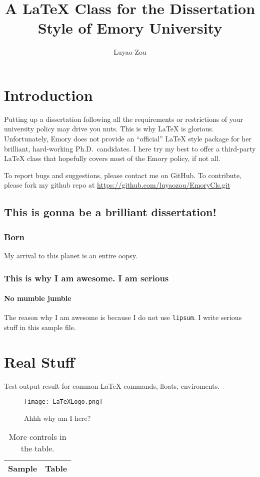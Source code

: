 \documentclass[draft,12pt]{emory}
\title{A \LaTeX{} Class for the Dissertation Style of Emory University}
\author{Luyao Zou}                      %
\begin{document}
\chapter{Introduction}
Putting up a dissertation following all the requirements or restrictions of
your university policy may drive you nuts. This is why \LaTeX{} is glorious. 
Unfortunately, Emory does not provide an ``official'' \LaTeX{} style package for
her brilliant, hard-working Ph.D.\ candidates. I here try my best to offer a
third-party \LaTeX{} class that hopefully covers most of the Emory policy, if not
all.

To report bugs and suggestions, please contact me on GitHub. To contribute, 
please fork my github repo at \url{https://github.com/luyaozou/EmoryCls.git}
  
\section{This is gonna be a brilliant dissertation!}
\subsection{Born}
My arrival to this planet is an entire oopsy. 


\subsection{This is why I am awesome. I am serious}
\subsubsection{No mumble jumble}
The reason why I am awesome is because I do not use \verb|lipsum|. I write 
serious stuff in this sample file.

\chapter{Real Stuff}
Test output result for common \LaTeX{} commands, floats, enviroments.

\begin{figure}[htp!]
  \centering
  \texttt{[image: LaTeXLogo.png]}
  \caption{Ahhh why am I here?}
\end{figure}

\begin{table}[htp!]
  \centering
  \caption{More controls in the table.}
  \begin{tabular}{l l}
    \hline
    Sample & Table \\
    \hline
  \end{tabular}
\end{table}
\end{document}
